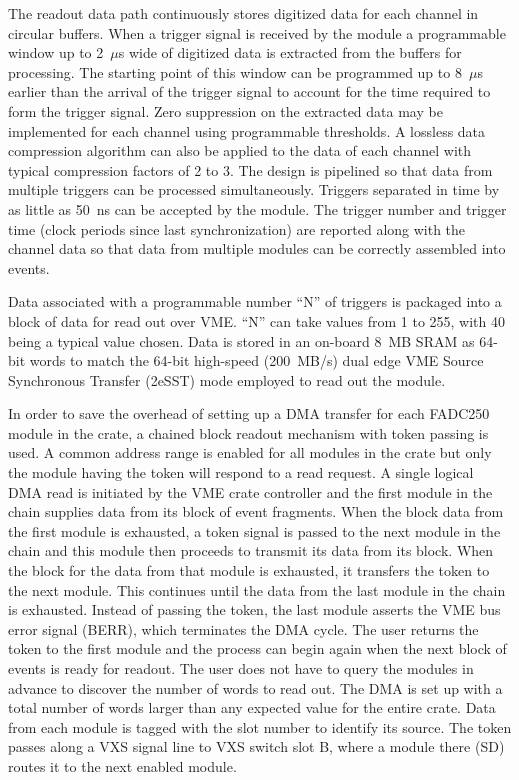 The readout data path continuously stores digitized data for each channel in circular buffers. When a trigger signal is received by the module a programmable window up to 2~$\mu$s wide of digitized data is extracted from the buffers for processing. The starting point of this window can be programmed up to 8~$\mu$s earlier than the arrival of the trigger signal to account for the time required to form the trigger signal.  Zero suppression on the extracted data may be implemented for each channel using programmable thresholds.  A lossless data compression algorithm can also be applied to the data of each channel with typical compression factors of 2 to 3. The design is pipelined so that data from multiple triggers can be processed simultaneously.  Triggers separated in time by as little as 50~ns can be accepted by the module. The trigger number and trigger time (clock periods since last synchronization) are reported along with the channel data so that data from multiple modules can be correctly assembled into events. 

Data associated with a programmable number ``N'' of triggers is packaged into a block of data for read out over VME.  ``N'' can take values from 1 to 255, with 40 being a typical value chosen.  Data is stored in an on-board 8~MB SRAM as 64-bit words to match the 64-bit high-speed (200~MB/s) dual edge VME Source Synchronous Transfer (2eSST) mode employed to read out the module.  

In order to save the overhead of setting up a DMA transfer for each FADC250 module in the crate, a chained block readout mechanism with token passing is used.  A common address range is enabled for all modules in the crate but only the module having the token will respond to a read request.  A single logical DMA read is initiated by the VME crate controller and the first module in the chain supplies data from its block of event fragments.  When the block data from the first module is exhausted, a token signal is passed to the next module in the chain and this module then proceeds to transmit its data from its block.  When the block for the data from that module is exhausted, it transfers the token to the next module.  This continues until the data from the last module in the chain is exhausted.  Instead of passing the token, the last module asserts the VME bus error signal (BERR), which terminates the DMA cycle.  The user returns the token to the first module and the process can begin again when the next block of events is ready for readout.  The user does not have to query the modules in advance to discover the number of words to read out.  The DMA is set up with a total number of words larger than any expected value for the entire crate.  Data from each module is tagged with the slot number to identify its source.  The token passes along a VXS signal line to VXS switch slot B, where a module there (SD) routes it to the next enabled module.


